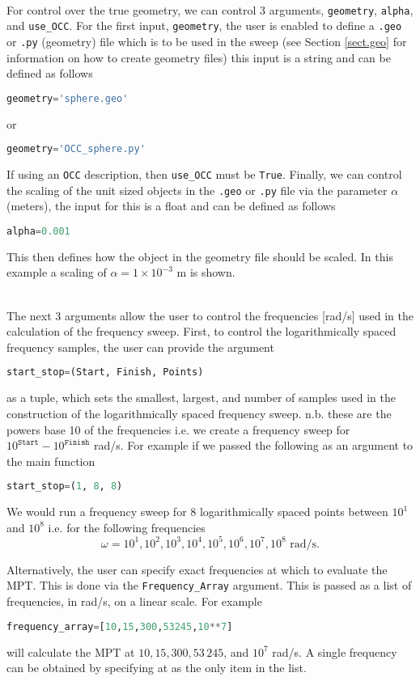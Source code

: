 \noindent
\\
For control over the true geometry, we can control 3 arguments, \texttt{geometry}, \texttt{alpha}, and \texttt{use\_OCC}. For the first input, \texttt{geometry}, the user is enabled to define a \texttt{.geo} or \texttt{.py} (geometry) file which is to be used in the sweep (see Section \ref{sect.geo} for information on how to create geometry files) this input is a string and can be defined as follows
\begin{lstlisting}[language=Python]
geometry='sphere.geo'
\end{lstlisting}
\noindent
or
\begin{lstlisting}[language=Python]
geometry='OCC_sphere.py'
\end{lstlisting}
\noindent
If using an \texttt{OCC} description, then \texttt{use\_OCC} must be \texttt{True}. Finally, we can control the scaling of the unit sized objects in the \texttt{.geo} or \texttt{.py} file via the parameter $\alpha$ (meters), the input for this is a float and can be defined as follows
\begin{lstlisting}[language=Python]
alpha=0.001
\end{lstlisting}
This then defines how the object in the geometry file should be scaled. In this example a scaling of $\alpha=1\times 10^{-3}$ m is shown.

\noindent
\\
The next 3 arguments allow the user to control the frequencies [rad/s] used in the calculation of the frequency sweep. First, to control the logarithmically spaced frequency samples, the user can provide the argument
\begin{lstlisting}[language=Python]
start_stop=(Start, Finish, Points)
\end{lstlisting}
as a tuple, which sets the smallest, largest, and number of samples used in the construction of the logarithmically spaced frequency sweep. n.b. these are the powers base 10 of the frequencies i.e. we create a frequency sweep for $10^{\texttt{Start}}-10^{\texttt{Finish}}$ rad/s. For example if we passed the following as an argument to the main function
\begin{lstlisting}[language=Python]
start_stop=(1, 8, 8)
\end{lstlisting}
We would run a frequency sweep for 8 logarithmically spaced points between $10^1$ and $10^8$ i.e. for the following frequencies
$$\omega = 10^1,10^2,10^3,10^4,10^5,10^6,10^7,10^8\textrm{ rad/s}.$$

\noindent
Alternatively, the user can specify exact frequencies at which to evaluate the MPT. This is done via the \texttt{Frequency\_Array} argument. This is passed as a list of frequencies, in rad/s, on a linear scale. For example
\begin{lstlisting}[language=Python]
frequency_array=[10,15,300,53245,10**7]
\end{lstlisting}
will calculate the MPT at $10,15,300,53\,245$, and $10^7$ rad/s. A single frequency can be obtained by specifying at as the only item in the list.\\

